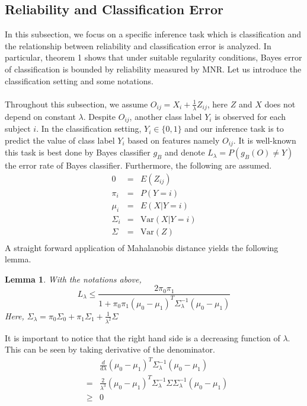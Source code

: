 \documentclass[11pt,journal,compsoc]{IEEEtran}
\newtheorem{lemma}{Lemma}
\begin{document}
\subsection{Reliability and Classification Error}

In this subsection, we focus on a specific inference task which is classification and the relationship between reliability and classification error is analyzed. In particular, theorem 1 shows that under suitable regularity conditions, Bayes error of classification is bounded by reliability measured by MNR. Let us introduce the classification setting and some notations. \\
\\
Throughout this subsection, we assume $O_{ij}=X_i+ \frac{1}{\lambda} Z_{ij}$, here $Z$ and $X$ does not depend on constant $\lambda$. Despite $O_{ij}$, another class label $Y_i$ is observed for each subject $i$. In the classification setting, $Y_i \in \{0,1\}$ and our inference task is to predict the value of class label $Y_i$ based on features namely $O_{ij}$. It is well-known this task is best done by Bayes classifier $g_B$ and denote $L_{\lambda}=P(g_B(O)\neq Y)$ the error rate of Bayes classifier. Furthermore, the following are assumed.
\begin{eqnarray*}
0&=& E(Z_{ij}) \\
\pi_i &=&P(Y=i) \\
\mu_i &=&E(X|Y=i)\\
\Sigma_i&=& \text{Var}(X|Y=i)  \\
\Sigma &=& \text{Var}(Z)  \\
\end{eqnarray*}
A straight forward application of Mahalanobis distance yields the following lemma.
\begin{lemma} With the notations above,
\[L_\lambda \leq \frac{2\pi_0\pi_1}{1+\pi_0\pi_1(\mu_0-\mu_1)^T\Sigma_\lambda^{-1}(\mu_0-\mu_1)}\]
Here, $\Sigma_\lambda=\pi_0\Sigma_0+\pi_1\Sigma_1+\frac{1}{\lambda^2}\Sigma$ 
\end{lemma}
\noindent It is important to notice that the right hand side is a decreasing function of $\lambda$. This can be seen by taking derivative of the denominator.
\begin{eqnarray*}
& &\frac{d}{d\lambda}(\mu_0-\mu_1)^T\Sigma_\lambda^{-1}(\mu_0-\mu_1) \\
&=&\frac{2}{\lambda^3}(\mu_0-\mu_1)^T\Sigma_\lambda^{-1}\Sigma\Sigma_\lambda^{-1}(\mu_0-\mu_1) \\
&\geq&  0
\end{eqnarray*}
\end{document}
